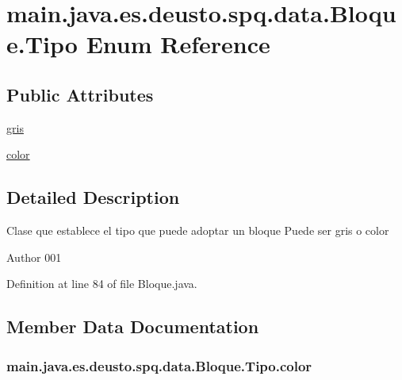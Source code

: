 \hypertarget{enummain_1_1java_1_1es_1_1deusto_1_1spq_1_1data_1_1_bloque_1_1_tipo}{}\section{main.\+java.\+es.\+deusto.\+spq.\+data.\+Bloque.\+Tipo Enum Reference}
\label{enummain_1_1java_1_1es_1_1deusto_1_1spq_1_1data_1_1_bloque_1_1_tipo}
\subsection*{Public Attributes}
\begin{DoxyCompactItemize}
\item 
\hyperlink{enummain_1_1java_1_1es_1_1deusto_1_1spq_1_1data_1_1_bloque_1_1_tipo_aa00bb1fc4a841bd07186be450d92ffd5}{gris}
\item 
\hyperlink{enummain_1_1java_1_1es_1_1deusto_1_1spq_1_1data_1_1_bloque_1_1_tipo_a90a8e213811a3f3a630880b8c1b85a53}{color}
\end{DoxyCompactItemize}


\subsection{Detailed Description}
Clase que establece el tipo que puede adoptar un bloque Puede ser gris o color

\begin{DoxyAuthor}{Author}
001 
\end{DoxyAuthor}


Definition at line 84 of file Bloque.\+java.



\subsection{Member Data Documentation}
\subsubsection[{\texorpdfstring{color}{color}}]{\setlength{\rightskip}{0pt plus 5cm}main.\+java.\+es.\+deusto.\+spq.\+data.\+Bloque.\+Tipo.\+color}\hypertarget{enummain_1_1java_1_1es_1_1deusto_1_1spq_1_1data_1_1_bloque_1_1_tipo_a90a8e213811a3f3a630880b8c1b85a53}{}\label{enummain_1_1java_1_1es_1_1deusto_1_1spq_1_1data_1_1_bloque_1_1_tipo_a90a8e213811a3f3a630880b8c1b85a53}



